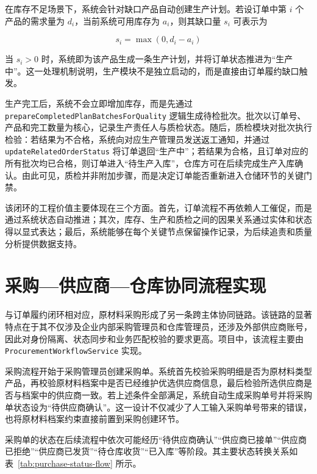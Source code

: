 在库存不足场景下，系统会针对缺口产品自动创建生产计划。若设订单中第 $i$ 个产品的需求量为 $d_i$，当前系统可用库存为 $a_i$，则其缺口量 $s_i$ 可表示为

\begin{equation}
 s_i = \max(0, d_i - a_i)
\end{equation}

当 $s_i > 0$ 时，系统即为该产品生成一条生产计划，并将订单状态推进为“生产中”。这一处理机制说明，生产模块不是独立启动的，而是直接由订单履约缺口触发。

生产完工后，系统不会立即增加库存，而是先通过 \texttt{prepareCompletedPlanBatchesForQuality} 逻辑生成待检批次。批次以订单号、产品和完工数量为核心，记录生产责任人与质检状态。随后，质检模块对批次执行检验：若结果为不合格，系统向对应生产管理员发送返工通知，并通过 \texttt{updateRelatedOrderStatus} 将订单退回“生产中”；若结果为合格，且订单对应的所有批次均已合格，则订单进入“待生产入库”，仓库方可在后续完成生产入库确认。由此可见，质检并非附加步骤，而是决定订单能否重新进入仓储环节的关键门禁。

该闭环的工程价值主要体现在三个方面。首先，订单流程不再依赖人工催促，而是通过系统状态自动推进；其次，库存、生产和质检之间的因果关系通过实体和状态得以显式表达；最后，系统能够在每个关键节点保留操作记录，为后续追责和质量分析提供数据支持。

\section{采购—供应商—仓库协同流程实现}

与订单履约闭环相对应，原材料采购形成了另一条跨主体协同链路。该链路的显著特点在于其不仅涉及企业内部采购管理员和仓库管理员，还涉及外部供应商账号，因此对身份隔离、状态同步和业务匹配校验的要求更高。项目中，该流程主要由 \texttt{ProcurementWorkflowService} 实现。

采购流程开始于采购管理员创建采购单。系统首先校验采购明细是否为原材料类型产品，再校验原材料档案中是否已经维护优选供应商信息，最后检验所选供应商是否与档案中的供应商一致。若上述条件全部满足，系统自动生成采购单号并将采购单状态设为“待供应商确认”。这一设计不仅减少了人工输入采购单号带来的错误，也将原材料档案约束直接前置到采购创建环节。

采购单的状态在后续流程中依次可能经历“待供应商确认”“供应商已接单”“供应商已拒绝”“供应商已发货”“待仓库收货”“已入库”等阶段。其主要状态转换关系如表~\ref{tab:purchase-status-flow} 所示。

